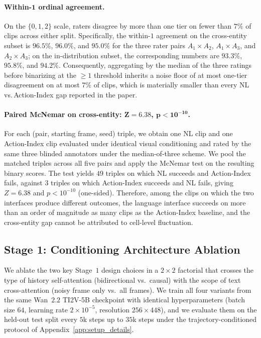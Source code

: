 \paragraph{Within-$\mathbf{1}$ ordinal agreement.}
On the $\{0,1,2\}$ scale, raters disagree by more than one tier on fewer than $7\%$ of clips across either split. Specifically, the within-$1$ agreement on the cross-entity subset is $96.5\%$, $96.0\%$, and $95.0\%$ for the three rater pairs $A_1\!\times\!A_2$, $A_1\!\times\!A_3$, and $A_2\!\times\!A_3$; on the in-distribution subset, the corresponding numbers are $93.3\%$, $95.8\%$, and $94.2\%$. Consequently, aggregating by the median of the three ratings before binarizing at the $\geq 1$ threshold inherits a noise floor of at most one-tier disagreement on at most $7\%$ of clips, which is materially smaller than every NL\,vs.\,Action-Index gap reported in the paper.

\paragraph{Paired McNemar on cross-entity: $\mathbf{Z=6.38}$, $\mathbf{p<10^{-10}}$.}
For each (pair, starting frame, seed) triple, 
we obtain one NL clip and one Action-Index clip 
evaluated under identical visual conditioning and 
rated by the same three blinded annotators under the 
median-of-three scheme. We pool the matched triples 
across all five pairs and apply the McNemar test on the 
resulting binary scores. The test yields $49$ triples 
on which NL succeeds and Action-Index fails, against $3$ 
triples on which Action-Index succeeds and NL fails, 
giving $Z=6.38$ and $p<10^{-10}$ (one-sided). Therefore, among the clips on which the two interfaces produce different outcomes, the language interface succeeds on more than an order of magnitude as many clips as the Action-Index baseline, and the cross-entity gap cannot be attributed to cell-level fluctuation.

\subsection{Stage 1: Conditioning Architecture Ablation}
\label{app:stage1_ablation}

We ablate the two key Stage~$1$ design choices in a $2\times 2$ factorial that crosses the type of history self-attention (bidirectional vs.\ causal) with the scope of text cross-attention (noisy frame only vs.\ all frames). We train all four variants from the same Wan~$2.2$ TI2V-5B checkpoint with identical hyperparameters (batch size $64$, learning rate $2\times 10^{-5}$, resolution $256\times 448$), and we evaluate them on the held-out test split every $5$k steps up to $35$k steps under the trajectory-conditioned protocol of Appendix~\ref{app:setup_details}.

